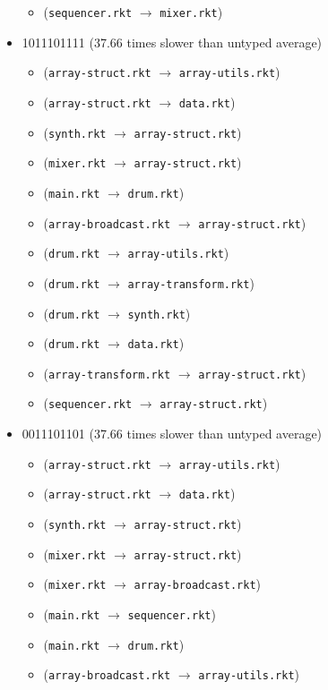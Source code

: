 \documentclass{article}
\newcommand{\mono}[1]{\texttt{#1}}
\begin{document}
\begin{itemize}
\begin{itemize}
  \item (\mono{sequencer.rkt} $\rightarrow$ \mono{mixer.rkt})
  \end{itemize}
\item 1011101111 (37.66 times slower than untyped average)
  \begin{itemize}
  \item (\mono{array-struct.rkt} $\rightarrow$ \mono{array-utils.rkt})
  \item (\mono{array-struct.rkt} $\rightarrow$ \mono{data.rkt})
  \item (\mono{synth.rkt} $\rightarrow$ \mono{array-struct.rkt})
  \item (\mono{mixer.rkt} $\rightarrow$ \mono{array-struct.rkt})
  \item (\mono{main.rkt} $\rightarrow$ \mono{drum.rkt})
  \item (\mono{array-broadcast.rkt} $\rightarrow$ \mono{array-struct.rkt})
  \item (\mono{drum.rkt} $\rightarrow$ \mono{array-utils.rkt})
  \item (\mono{drum.rkt} $\rightarrow$ \mono{array-transform.rkt})
  \item (\mono{drum.rkt} $\rightarrow$ \mono{synth.rkt})
  \item (\mono{drum.rkt} $\rightarrow$ \mono{data.rkt})
  \item (\mono{array-transform.rkt} $\rightarrow$ \mono{array-struct.rkt})
  \item (\mono{sequencer.rkt} $\rightarrow$ \mono{array-struct.rkt})
  \end{itemize}
\item 0011101101 (37.66 times slower than untyped average)
  \begin{itemize}
  \item (\mono{array-struct.rkt} $\rightarrow$ \mono{array-utils.rkt})
  \item (\mono{array-struct.rkt} $\rightarrow$ \mono{data.rkt})
  \item (\mono{synth.rkt} $\rightarrow$ \mono{array-struct.rkt})
  \item (\mono{mixer.rkt} $\rightarrow$ \mono{array-struct.rkt})
  \item (\mono{mixer.rkt} $\rightarrow$ \mono{array-broadcast.rkt})
  \item (\mono{main.rkt} $\rightarrow$ \mono{sequencer.rkt})
  \item (\mono{main.rkt} $\rightarrow$ \mono{drum.rkt})
  \item (\mono{array-broadcast.rkt} $\rightarrow$ \mono{array-utils.rkt})

\end{itemize}
\end{itemize}
\end{document}
